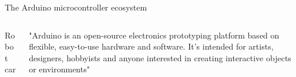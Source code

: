 \documentclass[compress]{beamer}
\begin{document}
\begin{frame}{The Arduino microcontroller ecosystem}
\begin{columns}
\begin{column}{0.25\linewidth}
\begin{center}
                Robot car
            \end{center}
        \end{column}
         \begin{column}{0.5\linewidth}
             "Arduino is an open-source electronics prototyping
             platform based on flexible,
             easy-to-use hardware and
             software. It's intended for
             artists, designers, hobbyists
             and anyone interested in
             creating interactive objects
             or environments"
        \end{column}
    \end{columns}
\end{frame}

\end{document}
